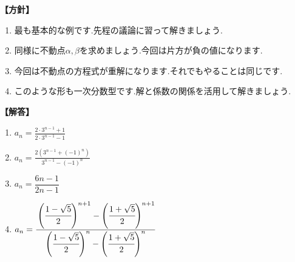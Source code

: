 \noindent\textbf{【方針】}
\begin{enumerate}[label=(\arabic*),parsep=3pt]
  \item 最も基本的な例です.先程の議論に習って解きましょう.
  \item 同様に不動点$\alpha,\beta$を求めましょう.今回は片方が負の値になります.
  \item 今回は不動点の方程式が重解になります.それでもやることは同じです.
  \item このような形も一次分数型です.解と係数の関係を活用して解きましょう.
\end{enumerate}

\noindent\textbf{【解答】}
\begin{enumerate}[label=(\arabic*),parsep=3pt]
  \item $\displaystyle a_n=\frac{2\cdot3^{n-1}+1}{2\cdot3^{n-1}-1}$
  \item $\displaystyle a_n=\frac{2\left(3^{n-1}+(-1)^n\right)}{3^{n-1}-(-1)^n}$
  \item $a_{n}=\dfrac{6n-1}{2n-1}$
  \item $\displaystyle a_n=\cfrac{\left(\cfrac{1-\sqrt{5}}{2}\right)^{n+1}-\left(\cfrac{1+\sqrt{5}}{2}\right)^{n+1}}{\left(\cfrac{1-\sqrt{5}}{2}\right)^n-\left(\cfrac{1+\sqrt{5}}{2}\right)^n}$
\end{enumerate}

